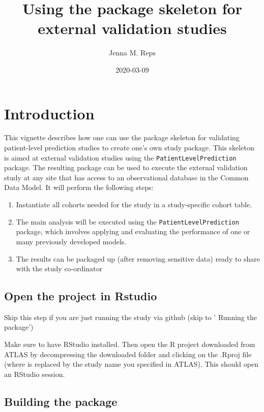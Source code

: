 \documentclass[
]{article}
\title{Using the package skeleton for external validation studies}
\author{Jenna M. Reps}
\date{2020-03-09}
\providecommand{\tightlist}{%
  \setlength{\itemsep}{0pt}\setlength{\parskip}{0pt}}
\begin{document}
\maketitle

{
\setcounter{tocdepth}{2}
\tableofcontents
}
\hypertarget{introduction}{%
\section{Introduction}\label{introduction}}

This vignette describes how one can use the package skeleton for
validating patient-level prediction studies to create one's own study
package. This skeleton is aimed at external validation studies using the
\texttt{PatientLevelPrediction} package. The resulting package can be
used to execute the external validation study at any site that has
access to an observational database in the Common Data Model. It will
perform the following steps:

\begin{enumerate}
\def\labelenumi{\arabic{enumi}.}
\tightlist
\item
  Instantiate all cohorts needed for the study in a study-specific
  cohort table.
\item
  The main analysis will be executed using the
  \texttt{PatientLevelPrediction} package, which involves applying and
  evaluating the performance of one or many previously developed models.
\item
  The results can be packaged up (after removing sensitive data) ready
  to share with the study co-ordinator
\end{enumerate}

\hypertarget{open-the-project-in-rstudio}{%
\subsection{Open the project in
Rstudio}\label{open-the-project-in-rstudio}}

Skip this step if you are just running the study via github (skip to '
Running the package')

Make sure to have RStudio installed. Then open the R project downloaded
from ATLAS by decompressing the downloaded folder and clicking on the
.Rproj file (where is replaced by the study name you specified in
ATLAS). This should open an RStudio session.

\hypertarget{building-the-package}{%
\subsection{Building the package}\label{building-the-package}}
\end{document}
